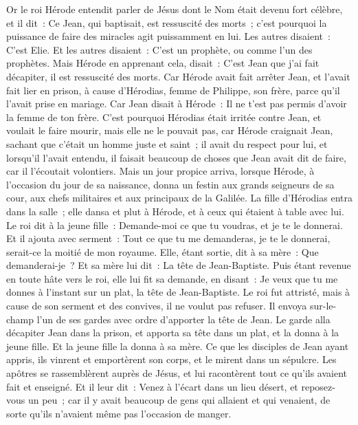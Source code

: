 \begin{multicols}{2}
Or le roi Hérode entendit parler de Jésus dont le Nom était devenu fort célèbre, et il dit~: Ce Jean, qui baptisait, est ressuscité des morts~; c'est pourquoi la puissance de faire des miracles agit puissamment en lui.
Les autres disaient~: C'est Elie. Et les autres disaient~: C'est un prophète, ou comme l'un des prophètes.
Mais Hérode en apprenant cela, disait~: C'est Jean que j'ai fait décapiter, il est ressuscité des morts.
Car Hérode avait fait arrêter Jean, et l'avait fait lier en prison, à cause d'Hérodias, femme de Philippe, son frère, parce qu'il l'avait prise en mariage.
Car Jean disait à Hérode~: Il ne t'est pas permis d'avoir la femme de ton frère.
C'est pourquoi Hérodias était irritée contre Jean, et voulait le faire mourir,
mais elle ne le pouvait pas, car Hérode craignait Jean, sachant que c'était un homme juste et saint~; il avait du respect pour lui, et lorsqu'il l'avait entendu, il faisait beaucoup de choses que Jean avait dit de faire, car il l'écoutait volontiers.
 Mais un jour propice arriva, lorsque Hérode, à l'occasion du jour de sa naissance, donna un festin aux grands seigneurs de sa cour, aux chefs militaires et aux principaux de la Galilée.
La fille d'Hérodias entra dans la salle~; elle dansa et plut à Hérode, et à ceux qui étaient à table avec lui. Le roi dit à la jeune fille~: Demande-moi ce que tu voudras, et je te le donnerai.
Et il ajouta avec serment~: Tout ce que tu me demanderas, je te le donnerai, serait-ce la moitié de mon royaume.
Elle, étant sortie, dit à sa mère~: Que demanderai-je~? Et sa mère lui dit~: La tête de Jean-Baptiste.
Puis étant revenue en toute hâte vers le roi, elle lui fit sa demande, en disant~: Je veux que tu me donnes à l'instant sur un plat, la tête de Jean-Baptiste.
Le roi fut attristé, mais à cause de son serment et des convives, il ne voulut pas refuser.
Il envoya sur-le-champ l'un de ses gardes avec ordre d'apporter la tête de Jean.
Le garde alla décapiter Jean dans la prison, et apporta sa tête dans un plat, et la donna à la jeune fille. Et la jeune fille la donna à sa mère.
Ce que les disciples de Jean ayant appris, ils vinrent et emportèrent son corps, et le mirent dans un sépulcre.
Les apôtres se rassemblèrent auprès de Jésus, et lui racontèrent tout ce qu'ils avaient fait et enseigné.
Et il leur dit~: Venez à l'écart dans un lieu désert, et reposez-vous un peu~; car il y avait beaucoup de gens qui allaient et qui venaient, de sorte qu'ils n'avaient même pas l'occasion de manger.

\end{multicols}
